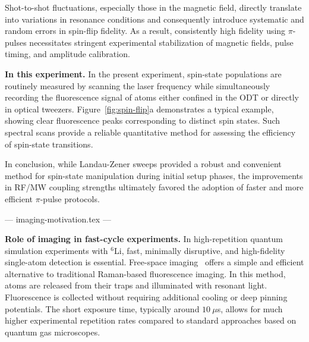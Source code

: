 Shot-to-shot fluctuations, especially those in the magnetic field, directly translate into variations in resonance conditions and consequently introduce systematic and random errors in spin-flip fidelity. As a result, consistently high fidelity using $\pi$-pulses necessitates stringent experimental stabilization of magnetic fields, pulse timing, and amplitude calibration.


\textbf{In this experiment.}
In the present experiment, spin-state populations are routinely measured by scanning the laser frequency while simultaneously recording the fluorescence signal of atoms either confined in the ODT or directly in optical tweezers. Figure~\ref{fig:spin-flip}a demonstrates a typical example, showing clear fluorescence peaks corresponding to distinct spin states. Such spectral scans provide a reliable quantitative method for assessing the efficiency of spin-state transitions.

In conclusion, while Landau-Zener sweeps provided a robust and convenient method for spin-state manipulation during initial setup phases, the improvements in RF/MW coupling strengths ultimately favored the adoption of faster and more efficient $\pi$-pulse protocols.

--- imaging-motivation.tex ---

\textbf{Role of imaging in fast-cycle experiments.}  
In high-repetition quantum simulation experiments with ${}^6$Li, fast, minimally disruptive, and high-fidelity single-atom detection is essential. Free-space imaging~\cite{bergschneider_spin-resolved_2018,su_fast_2025} offers a simple and efficient alternative to traditional Raman-based fluorescence imaging. In this method, atoms are released from their traps and illuminated with resonant light. Fluorescence is collected without requiring additional cooling or deep pinning potentials. The short exposure time, typically around $10~\mu$s, allows for much higher experimental repetition rates compared to standard approaches based on quantum gas microscopes.

